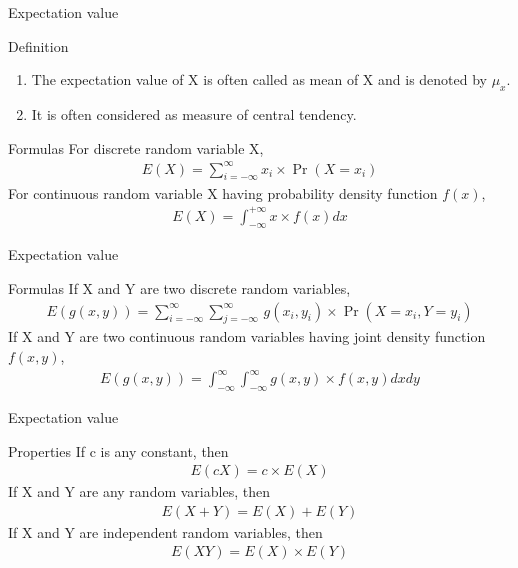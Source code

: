 \documentclass{beamer}
\providecommand{\brak}[1]{\ensuremath{\left(#1\right)}}
\begin{document}
\begin{frame}{Expectation value}
    \begin{block}{Definition}
        \begin{enumerate}
            \item The expectation value of X is often called as mean of X and is denoted by $\mu_x$.
            \item It is often considered as measure of central tendency.
        \end{enumerate}
    \end{block}
    \begin{block}{Formulas}
        For discrete random variable X,
        \begin{align}
            E\brak{X}=\sum^{\infty}_{i=-\infty} x_{i}\times\Pr\brak{X=x_{i}}
        \end{align}
        For continuous random variable X having probability density function $f(x)$,
        \begin{align}
            E\brak{X}=\int_{-\infty}^{+\infty} x\times f(x)dx
        \end{align}
    \end{block}
\end{frame}
\begin{frame}{Expectation value}
    \begin{block}{Formulas}
        If X and Y are two discrete random variables,
        \begin{align}
            E\brak{g(x,y)}=\sum^{\infty}_{i=-\infty}\sum^{\infty}_{j=-\infty}\,g(x_i,y_i)\times \Pr\brak{X=x_i,Y=y_i}
        \end{align}
        If X and Y are two continuous random variables having joint density function $f(x,y)$,
        \begin{align}
            E\brak{g(x,y)}=\int_{-\infty}^{\infty}\int_{-\infty}^{\infty} g(x,y) \times f(x,y)dxdy
        \end{align}
    \end{block}
\end{frame}
\begin{frame}{Expectation value}
    \begin{block}{Properties}
        If c is any constant, then
        \begin{align}
            E\brak{cX}=c\times E\brak{X}
        \end{align}
        If X and Y are any random variables, then
        \begin{align}
            E\brak{X + Y} = E\brak{X} + E\brak{Y}
        \end{align}
        If X and Y are independent random variables, then
        \begin{align}
            E\brak{XY} = E\brak{X} \times E\brak{Y}
        \end{align}
    \end{block}
\end{frame}
\end{document}
